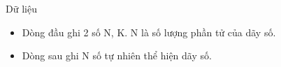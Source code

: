 Dữ liệu  
\begin{itemize}
	\item     Dòng đầu ghi 2 số N, K. N là số lượng phần tử của dãy số.   
	\item     Dòng sau ghi N số tự nhiên thể hiện dãy số.   
\end{itemize}